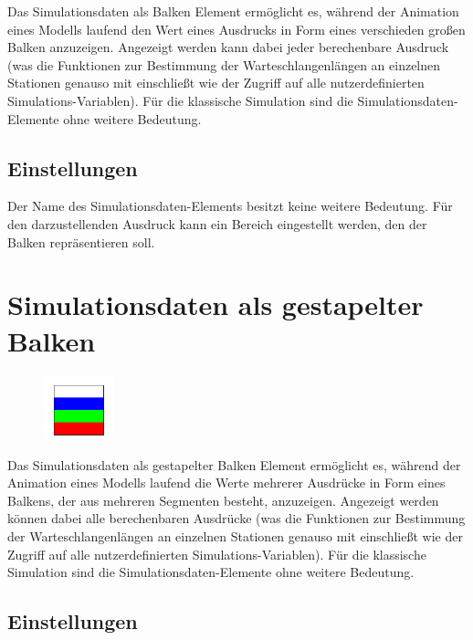 Das Simulationsdaten als Balken Element ermöglicht es, während der Animation eines Modells laufend den Wert
eines Ausdrucks in Form eines verschieden großen Balken anzuzeigen. Angezeigt werden kann dabei jeder berechenbare
Ausdruck (was die Funktionen zur Bestimmung der Warteschlangenlängen an einzelnen Stationen genauso mit einschließt
wie der Zugriff auf alle nutzerdefinierten Simulations-Variablen). Für die klassische Simulation sind die
Simulationsdaten-Elemente ohne weitere Bedeutung.

\subsection*{Einstellungen}

Der Name des Simulationsdaten-Elements besitzt keine weitere Bedeutung. Für den darzustellenden Ausdruck kann
ein Bereich eingestellt werden, den der Balken repräsentieren soll.


\section{Simulationsdaten als gestapelter Balken}
\label{ref:ModelElementAnimationBarStack}

\begin{figure}
\vspace{-22pt}
\includegraphics[width=2cm]{imageModelElementAnimationBarStack.png}
\vspace{-22pt}
\end{figure}

Das Simulationsdaten als gestapelter Balken Element ermöglicht es, während der Animation eines Modells laufend die Werte
mehrerer Ausdrücke in Form eines Balkens, der aus mehreren Segmenten besteht, anzuzeigen. Angezeigt werden können dabei
alle berechenbaren Ausdrücke (was die Funktionen zur Bestimmung der Warteschlangenlängen an einzelnen Stationen genauso
mit einschließt wie der Zugriff auf alle nutzerdefinierten Simulations-Variablen). Für die klassische Simulation sind die
Simulationsdaten-Elemente ohne weitere Bedeutung.

\subsection*{Einstellungen}


